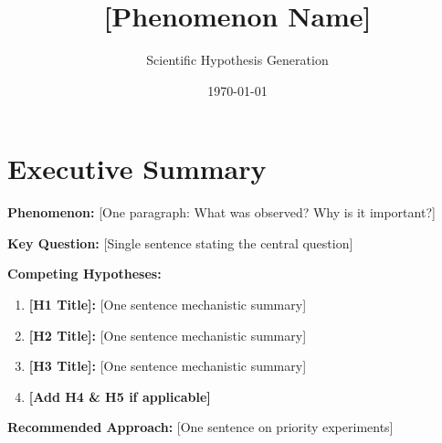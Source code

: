 \documentclass[11pt,letterpaper]{article}
\title{[Phenomenon Name]}
\author{Scientific Hypothesis Generation}
\date{\today}
\begin{document}
\maketitle


\section*{Executive Summary}

\begin{summarybox}
\textbf{Phenomenon:} [One paragraph: What was observed? Why is it important?]

\vspace{0.2cm}
\textbf{Key Question:} [Single sentence stating the central question]

\vspace{0.2cm}
\textbf{Competing Hypotheses:}
\begin{enumerate}
  \item \textbf{[H1 Title]:} [One sentence mechanistic summary]
  \item \textbf{[H2 Title]:} [One sentence mechanistic summary]
  \item \textbf{[H3 Title]:} [One sentence mechanistic summary]
  \item \textbf{[Add H4 \& H5 if applicable]}
\end{enumerate}

\vspace{0.2cm}
\textbf{Recommended Approach:} [One sentence on priority experiments]

\end{summarybox}

\vspace{0.3cm}

\end{document}
